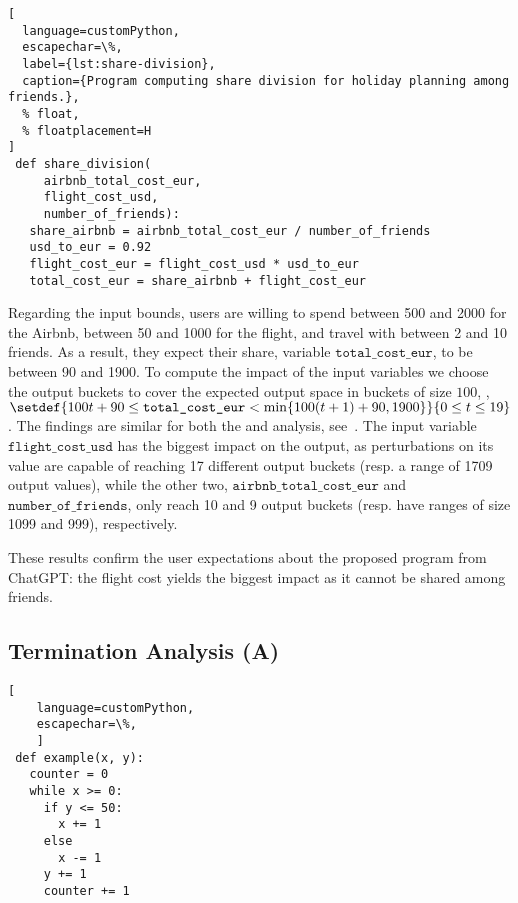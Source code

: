 \begin{lstlisting}[
  language=customPython,
  escapechar=\%,
  label={lst:share-division},
  caption={Program computing share division for holiday planning among friends.},
  % float,
  % floatplacement=H
]
 def share_division(
     airbnb_total_cost_eur,
     flight_cost_usd,
     number_of_friends):
   share_airbnb = airbnb_total_cost_eur / number_of_friends
   usd_to_eur = 0.92
   flight_cost_eur = flight_cost_usd * usd_to_eur
   total_cost_eur = share_airbnb + flight_cost_eur
\end{lstlisting}
%
Regarding the input bounds, users are willing to spend between 500 and 2000 for the Airbnb, between 50 and 1000 for the flight, and travel with between 2 and 10 friends. As a result, they expect their share, variable $\texttt{total\_cost\_eur}$, to be between 90 and 1900.
To compute the impact of the input variables we choose the output buckets to cover the expected output space in buckets of size $100$, \ie, $\setdef{100t + 90 \le \texttt{total\_cost\_eur} < \min \{100(t + 1) + 90, 1900\}}{0 \le t \le 19}$.
The %
findings are similar for both the \outcomesname{} and \rangename{} analysis, see~.
The input variable $\texttt{flight\_cost\_usd}$ has the biggest impact on the output, as perturbations on its value are capable of reaching 17 different output buckets (resp. a range of 1709 output values), while the other two, $\texttt{airbnb\_total\_cost\_eur}$ and $\texttt{number\_of\_friends}$, only reach 10 and 9 output buckets (resp. have ranges of size 1099 and 999), respectively.

These results confirm the user expectations about the proposed program from ChatGPT: the flight cost yields the biggest impact as it cannot be shared among friends.


\subsection{Termination Analysis (A)}

%
\begin{marginlisting}
  \caption{Example program from termination analysis.}
  \vspace{0.5cm}
\begin{lstlisting}[
    language=customPython,
    escapechar=\%,
    ]
 def example(x, y):
   counter = 0
   while x >= 0:
     if y <= 50:
       x += 1
     else
       x -= 1
     y += 1
     counter += 1
\end{lstlisting}
\end{marginlisting}

